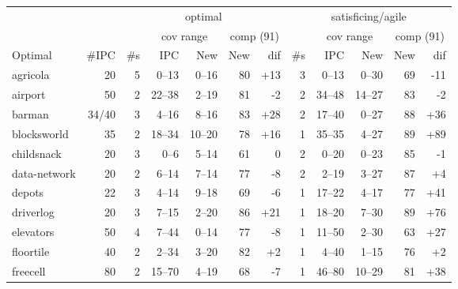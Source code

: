 \documentclass{article}
\begin{document}
            \begin{table} \centering
            \begin{tabular}{l@{}rr|rrrr|r|rrrr}
& & \multicolumn{5}{c}{optimal} & \multicolumn{5}{c}{satisficing/agile} \\

& & & \multicolumn{2}{c}{cov range} & \multicolumn{2}{c}{comp (91)} & & \multicolumn{2}{c}{cov range} & \multicolumn{2}{c}{comp (91)} \\

       Optimal &  \#IPC & \#s &      IPC &     New & New &                dif & \#s &       IPC &     New & New &                dif \\
\midrule
      agricola &     20 &   5 &    0--13 &   0--16 &  80 &  {\color{blue}+13} &   3 &     0--13 &   0--30 &  69 &   {\color{red}-11} \\
       airport &     50 &   2 &   22--38 &   2--19 &  81 &    {\color{red}-2} &   2 &    34--48 &  14--27 &  83 &    {\color{red}-2} \\
        barman &  34/40 &   3 &    4--16 &   8--16 &  83 &  {\color{blue}+28} &   2 &    17--40 &   0--27 &  88 &  {\color{blue}+36} \\
   blocksworld &     35 &   2 &   18--34 &  10--20 &  78 &  {\color{blue}+16} &   1 &    35--35 &   4--27 &  89 &  {\color{blue}+89} \\
    childsnack &     20 &   3 &     0--6 &   5--14 &  61 &                  0 &   2 &     0--20 &   0--23 &  85 &    {\color{red}-1} \\
  data-network &     20 &   2 &    6--14 &   7--14 &  77 &    {\color{red}-8} &   2 &     2--19 &   3--27 &  87 &   {\color{blue}+4} \\
        depots &     22 &   3 &    4--14 &   9--18 &  69 &    {\color{red}-6} &   1 &    17--22 &   4--17 &  77 &  {\color{blue}+41} \\
     driverlog &     20 &   3 &    7--15 &   2--20 &  86 &  {\color{blue}+21} &   1 &    18--20 &   7--30 &  89 &  {\color{blue}+76} \\
     elevators &     50 &   4 &    7--44 &   0--14 &  77 &    {\color{red}-8} &   1 &    11--50 &   2--30 &  63 &  {\color{blue}+27} \\
     floortile &     40 &   2 &    2--34 &   3--20 &  82 &   {\color{blue}+2} &   1 &     4--40 &   1--15 &  76 &   {\color{blue}+2} \\
      freecell &     80 &   2 &   15--70 &   4--19 &  68 &    {\color{red}-7} &   1 &    46--80 &  10--29 &  81 &  {\color{blue}+38} \\

\end{tabular}
\end{table}
\end{document}
